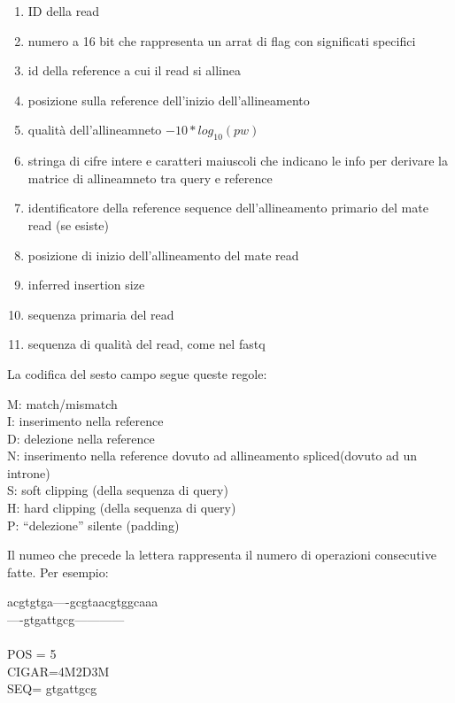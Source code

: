 \begin{enumerate}
\item ID della read
\item numero a 16 bit che rappresenta un arrat di flag con significati specifici
\item id della reference a cui il read si allinea
\item posizione sulla reference dell'inizio dell'allineamento
\item qualità dell'allineamneto $-10*log_10(pw)$
\item stringa di cifre intere e caratteri maiuscoli che indicano le info per derivare la matrice di allineamneto tra query e reference
\item identificatore della reference sequence
dell’allineamento primario del mate read (se esiste)
\item posizione di inizio dell’allineamento del mate read
\item inferred insertion size
\item sequenza primaria del read
\item sequenza di qualità del read, come nel fastq
\end{enumerate}

La codifica del sesto campo segue queste regole: 

\begin{tcolorbox}
M: match/mismatch\\
I: inserimento nella reference\\
D: delezione nella reference\\
N: inserimento nella reference dovuto ad allineamento
spliced(dovuto ad un introne)\\
S: soft clipping (della sequenza di query)\\
H: hard clipping (della sequenza di query)\\
P: “delezione” silente (padding)\\
\end{tcolorbox}

Il numeo che precede la lettera rappresenta il numero di operazioni consecutive fatte. Per esempio:\\

\begin{tcolorbox}
acgtgtga—-gcgtaacgtggcaaa\\
----gtgattgcg------------\\
\\
POS = 5\\
CIGAR=4M2D3M\\
SEQ= gtgattgcg
\end{tcolorbox}